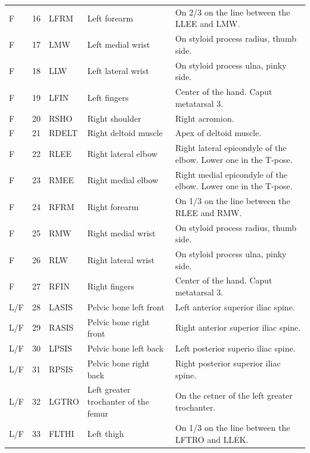 \documentclass[fleqn,12pt]{wlpeerj}
\begin{document}
\begin{table}
\begin{tabular}{lrlll}
    F   & 16 & LFRM  & Left forearm                          & On 2/3 on the line between the LLEE and LMW. \\
    F   & 17 & LMW   & Left medial wrist                     & On styloid process radius, thumb side. \\
    F   & 18 & LLW   & Left lateral wrist                    & On styloid process ulna, pinky side. \\
    F   & 19 & LFIN  & Left fingers                          & Center of the hand. Caput metatarsal 3. \\
    F   & 20 & RSHO  & Right shoulder                        & Right acromion. \\
    F   & 21 & RDELT & Right deltoid muscle                  & Apex of deltoid muscle. \\
    F   & 22 & RLEE  & Right lateral elbow                   & Right lateral epicondyle of the elbow. Lower one in the T-pose. \\
    F   & 23 & RMEE  & Right medial elbow                    & Right medial epicondyle of the elbow. Lower one in the T-pose. \\
    F   & 24 & RFRM  & Right forearm                         & On 1/3 on the line between the RLEE and RMW. \\
    F   & 25 & RMW   & Right medial wrist                    & On styloid process radius, thumb side. \\
    F   & 26 & RLW   & Right lateral wrist                   & On styloid process ulna, pinky side. \\
    F   & 27 & RFIN  & Right fingers                         & Center of the hand. Caput metatarsal 3. \\
    L/F & 28 & LASIS & Pelvic bone left front                & Left anterior superior iliac spine. \\
    L/F & 29 & RASIS & Pelvic bone right front               & Right anterior superior iliac spine. \\
    L/F & 30 & LPSIS & Pelvic bone left back                 & Left posterior superio iliac spine. \\
    L/F & 31 & RPSIS & Pelvic bone right back                & Right posterior superior iliac spine. \\
    L/F & 32 & LGTRO & Left greater trochanter of the femur  & On the cetner of the left greater trochanter. \\
    L/F & 33 & FLTHI & Left thigh                            & On 1/3 on the line between the LFTRO and LLEK. \\

\end{tabular}
\end{table}
\end{document}

